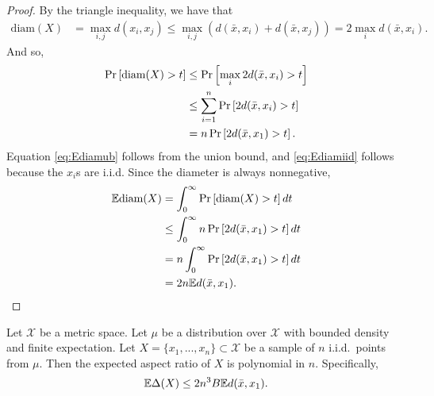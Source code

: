 \documentclass[../main.tex]{subfiles}
\newcommand{\set}[1]{\mathcal {#1}}
\newcommand{\dist}[2]{\distf({#1},{#2})}
\newcommand{\distf}{d}
\newcommand{\diam}[1]{\text{diam}({#1})}
\newcommand{\aspect}[1]{\Delta({#1})}
\begin{document}
\begin{proof}
    By the triangle inequality, we have that
    \begin{align}
        \diam{X}
        &= 
        \max_{i,j} \dist{x_i}{x_j}
        \le
        \max_{i,j} (\dist{\bar x}{x_i} + \dist{\bar x}{x_j})
        =
        2\max_i \dist{\bar x}{x_i}
        .
    \end{align}
    And so,
    \begin{align}
        \prob{\diam{X} > t}
        & \le
        \prob{\max_i 2\dist{\bar x}{x_i} > t}
        \\ &\le
        \sum_{i=1}^n\prob{2\dist{\bar x}{x_i} > t}
        \label{eq:Ediamub}
        \\ &=
        n\prob{2\dist{\bar x}{x_1} > t}
        \label{eq:Ediamiid}
        .
    \end{align}
    Equation \eqref{eq:Ediamub} follows from the union bound, 
    and \eqref{eq:Ediamiid} follows because the $x_i$s are i.i.d.
    Since the diameter is always nonnegative, 
    \begin{align}
        \E\diam{X} 
        &= 
        \int_0^\infty \prob{\diam{X} > t} dt
        \\ &\le
        \int_0^\infty n\prob{2\dist{\bar x}{x_1} > t} dt
        \\ &=
        n\int_0^\infty \prob{2\dist{\bar x}{x_1} > t} dt
        \\ &=
        2n \E\dist{\bar x}{x_1}
        \label{eq:Ediamproof}
        .
    \end{align}
\end{proof}


\begin{lemma}
    Let $\set X$ be a metric space.
    Let $\mu$ be a distribution over $\set X$ with bounded density and finite expectation.
    Let $X=\{x_1,...,x_n\}\subset\set X$ be a sample of $n$ i.i.d.\ points from $\mu$.
    Then the expected aspect ratio of $X$ is polynomial in $n$.
    Specifically, 
    \begin{equation}
        \E\aspect{X}\le2n^3B\E\dist{\bar x}{x_1}. 
    \end{equation}
\end{lemma}
\end{document}
